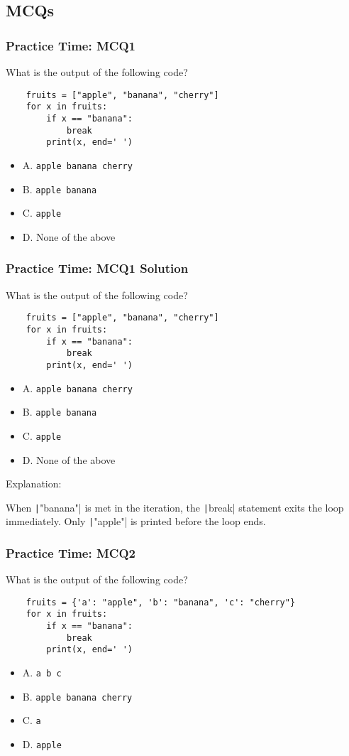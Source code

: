 \documentclass{beamer}
\newcommand{\python}[1]{\texttt|#1|}
\begin{document}
\subsection{MCQs}
\begin{frame}[fragile]
    \frametitle{Practice Time: MCQ1}
    What is the output of the following code?
    \begin{verbatim}
    fruits = ["apple", "banana", "cherry"]
    for x in fruits:
        if x == "banana":
            break
        print(x, end=' ')    
    \end{verbatim}
    \begin{itemize}
        \item A. \texttt{apple banana cherry}
        \item B. \texttt{apple banana}
        \item C. \texttt{apple }
        \item D. None of the above
    \end{itemize}
\end{frame}
\begin{frame}[fragile]
    \frametitle{Practice Time: MCQ1 Solution}
    What is the output of the following code?

    \begin{verbatim}
    fruits = ["apple", "banana", "cherry"]
    for x in fruits:
        if x == "banana":
            break
        print(x, end=' ')    
    \end{verbatim}

    \begin{itemize}
        \item A. \texttt{apple banana cherry}
        \item B. \texttt{apple banana}
        \item \alert{C. \texttt{apple }}
        \item D. None of the above
    \end{itemize}

    Explanation:

    When \python{"banana"} is met in the iteration,
    the \python{break} statement exits the loop immediately.
    Only \python{"apple"} is printed before the loop ends.
\end{frame}
\begin{frame}[fragile]
    \frametitle{Practice Time: MCQ2}
    What is the output of the following code?

    \begin{verbatim}
    fruits = {'a': "apple", 'b': "banana", 'c': "cherry"}
    for x in fruits:
        if x == "banana":
            break
        print(x, end=' ')
    \end{verbatim}

    \begin{itemize}
        \item A. \texttt{a b c }
        \item B. \texttt{apple banana cherry }
        \item C. \texttt{a }
        \item D. \texttt{apple }
    \end{itemize}
\end{frame}
\end{document}
